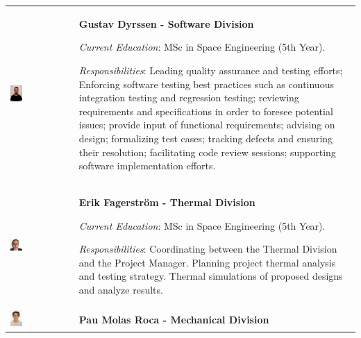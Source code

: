 \documentclass[a4paper,12pt,oneside]{article}
\begin{document}
\begin{longtable}[]{m{} m{}}
\includegraphics[width=0.2\textwidth]{1-introduction/img/gustav-dryssen.jpg} & \textbf{Gustav Dyrssen - Software Division}

\smallskip
\textit{Current Education}: MSc in Space Engineering (5th Year).

\smallskip
\textit{Responsibilities}: Leading quality assurance and testing efforts; Enforcing software testing best practices such as continuous integration testing and regression testing; reviewing requirements and specifications in order to foresee potential issues; provide input of functional requirements; advising on design; formalizing test cases; tracking defects and ensuring their resolution; facilitating code review sessions; supporting software implementation efforts.     
\bigskip
\\


\includegraphics[width=0.2\textwidth]{1-introduction/img/erik-fagerstrom.jpg} & \textbf{Erik Fagerström - Thermal Division}

\smallskip
\textit{Current Education}: MSc in Space Engineering (5th Year).


\smallskip
\textit{Responsibilities}: Coordinating between the Thermal Division and the Project Manager. Planning project thermal analysis and testing strategy. Thermal simulations of proposed designs and analyze results.
\bigskip
\\


\includegraphics[width=0.2\textwidth]{1-introduction/img/pau-molas-roca.jpg} & \textbf{Pau Molas Roca - Mechanical Division}


\end{longtable}
\end{document}
